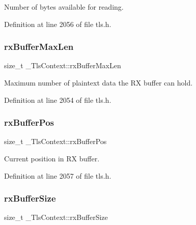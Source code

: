 Number of bytes available for reading. 



Definition at line 2056 of file tls.\+h.

\mbox{\label{struct__TlsContext_a8d229c7f4ae3e4a980d048449d75c903}} 
\subsubsection{\texorpdfstring{rx\+Buffer\+Max\+Len}{rxBufferMaxLen}}
{\footnotesize\ttfamily size\+\_\+t \+\_\+\+Tls\+Context\+::rx\+Buffer\+Max\+Len}



Maximum number of plaintext data the RX buffer can hold. 



Definition at line 2054 of file tls.\+h.

\mbox{\label{struct__TlsContext_ab671e4a19a6d90c0c3f8d36170ef63fc}} 
\subsubsection{\texorpdfstring{rx\+Buffer\+Pos}{rxBufferPos}}
{\footnotesize\ttfamily size\+\_\+t \+\_\+\+Tls\+Context\+::rx\+Buffer\+Pos}



Current position in RX buffer. 



Definition at line 2057 of file tls.\+h.

\mbox{\label{struct__TlsContext_aaa909ddf1e7397e6b1ac4d99b05a464a}} 
\subsubsection{\texorpdfstring{rx\+Buffer\+Size}{rxBufferSize}}
{\footnotesize\ttfamily size\+\_\+t \+\_\+\+Tls\+Context\+::rx\+Buffer\+Size}



